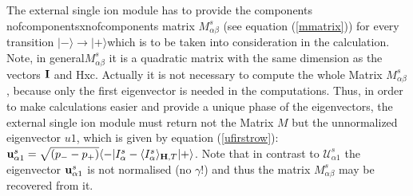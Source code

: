 The external single ion module has to provide the components nofcomponentsxnofcomponents
matrix $M^s_{\alpha\beta}$ (see equation (\ref{mmatrix})) for every transition
$|-\rangle \rightarrow |+\rangle$which is to be taken into consideration 
in the calculation. Note, in general$M^s_{\alpha\beta}$ it is a quadratic matrix with the same
dimension as the vectors $\mathbf I$ and Hxc. 
Actually it is not necessary to compute the whole  Matrix $M^s_{\alpha\beta}$, because
only the first eigenvector is needed in the computations.
Thus, in order to make calculations easier and provide a unique phase of the eigenvectors, the 
external single ion module must return not the Matrix $M$ but the unnormalized
eigenvector $u1$, which is given by equation (\ref{ufirstrow}):
 ${\mathbf u^s_{\alpha1}}=\sqrt{(p_--p_+)}\langle -|I^s_{\alpha}-\langle I^s_{\alpha}\rangle_{\mathbf H,T}|+\rangle$. 
Note that in contrast to ${\mathcal U^s_{\alpha1}}$ the eigenvector
${\mathbf u^s_{\alpha1}}$ is not normalised (no $\gamma$!)
and thus the matrix  $M^s_{\alpha\beta}$ may be recovered from it.

